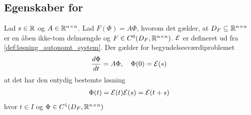 \subsection[Egenskaber for \texorpdfstring{$e^{tA}$}{exp(tA)}]{Egenskaber for }


\begin{minipage}\textwidth
\begin{thmx} \textbf{} \label{sæt:begyndelsesværdiproblemet_for_phi}%
\newline
Lad $s\in \mathbb{R}$ og $A\in \mathbb{R}^{n\times n}$. Lad $F(\Phi)=A\Phi$, hvorom det gælder, at $D_F \subseteq \mathbb{R}^{n\times n}$ er en åben ikke-tom delmængde og $F \in C^0(D_F,\mathbb{R}^{n\times n})$. $\mathcal{E}$ er defineret ud fra \autoref{def:løsning_autonomt_system}.
Der gælder for begyndelsesværdiproblemet
%
\begin{align}\label{eq:begyndelsesværdiproblemet_for_phi}
    \frac{d\Phi}{dt}= A\Phi, \quad \Phi(0) = \mathcal{E}(s)
\end{align}
%
at det har den entydig bestemte løsning
%
\begin{align}
    \Phi(t) = \mathcal{E}(t)\mathcal{E}(s) = \mathcal{E}(t+s)
\end{align}
%
hvor $t\in I$ og $\Phi\in C^1(D_F,\mathbb{R}^{n\times n})$
%
\end{thmx}
\end{minipage}

